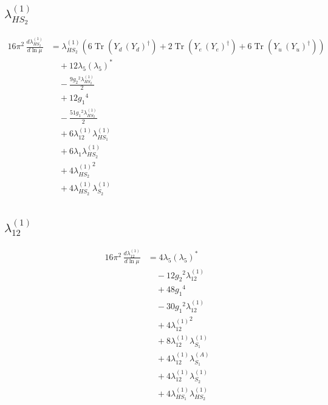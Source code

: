 \documentclass[10pt,a4paper]{article}
\begin{document}
\subsection*{$\lambda_{HS_2}^{(1)}$}
\begin{align*}
16\pi^2\,\frac{d \lambda_{HS_2}^{(1)}}{d\ln\mu} &={\lambda_{HS_2}^{(1)}} (6 \operatorname{Tr}\!\left({Y_d}\,\left({Y_d}\right)^{\dagger}\right)+2 \operatorname{Tr}\!\left({Y_e}\,\left({Y_e}\right)^{\dagger}\right)+6 \operatorname{Tr}\!\left({Y_u}\,\left({Y_u}\right)^{\dagger}\right)) \\
&\quad +12 {\lambda_5} \left({\lambda_5}\right)^{*} \\
&\quad -\frac{9 {g_2}^2 {\lambda_{HS_2}^{(1)}}}{2} \\
&\quad +12 {g_1}^4 \\
&\quad -\frac{51 {g_1}^2 {\lambda_{HS_2}^{(1)}}}{2} \\
&\quad +6 {\lambda_{12}^{(1)}} {\lambda_{HS_1}^{(1)}} \\
&\quad +6 {\lambda_1} {\lambda_{HS_2}^{(1)}} \\
&\quad +4 {\lambda_{HS_2}^{(1)}}^2 \\
&\quad +4 {\lambda_{HS_2}^{(1)}} {\lambda_{S_2}^{(1)}} \\
\end{align*}
\subsection*{$\lambda_{12}^{(1)}$}
\begin{align*}
16\pi^2\,\frac{d \lambda_{12}^{(1)}}{d\ln\mu} &=4 {\lambda_5} \left({\lambda_5}\right)^{*} \\
&\quad -12 {g_2}^2 {\lambda_{12}^{(1)}} \\
&\quad +48 {g_1}^4 \\
&\quad -30 {g_1}^2 {\lambda_{12}^{(1)}} \\
&\quad +4 {\lambda_{12}^{(1)}}^2 \\
&\quad +8 {\lambda_{12}^{(1)}} {\lambda_{S_1}^{(1)}} \\
&\quad +4 {\lambda_{12}^{(1)}} {\lambda_{S_1}^{(A)}} \\
&\quad +4 {\lambda_{12}^{(1)}} {\lambda_{S_2}^{(1)}} \\
&\quad +4 {\lambda_{HS_1}^{(1)}} {\lambda_{HS_2}^{(1)}} \\
\end{align*}
\end{document}
